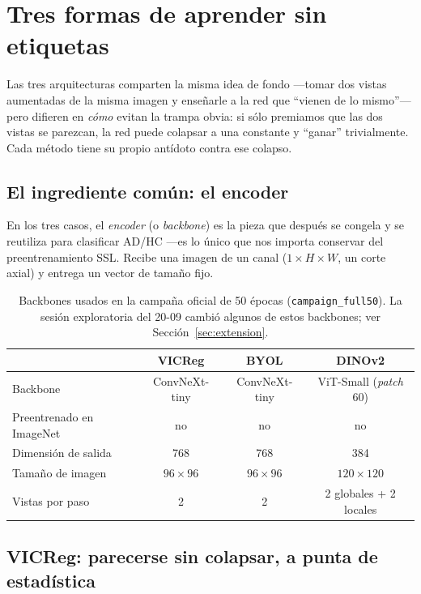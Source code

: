 \documentclass[11pt,a4paper]{article}
\begin{document}
\section{Tres formas de aprender sin etiquetas}
\label{sec:models}

Las tres arquitecturas comparten la misma idea de fondo —tomar dos vistas
aumentadas de la misma imagen y enseñarle a la red que ``vienen de lo
mismo''— pero difieren en \emph{cómo} evitan la trampa obvia: si sólo
premiamos que las dos vistas se parezcan, la red puede colapsar a una
constante y ``ganar'' trivialmente. Cada método tiene su propio antídoto
contra ese colapso.

\subsection{El ingrediente común: el encoder}

En los tres casos, el \emph{encoder} (o \emph{backbone}) es la pieza que
después se congela y se reutiliza para clasificar AD/HC —es lo único que nos
importa conservar del preentrenamiento SSL. Recibe una imagen de un canal
($1\times H\times W$, un corte axial) y entrega un vector de tamaño fijo.

\begin{table}[htbp]
\centering
\small
\begin{tabular}{lccc}
\toprule
 & \textbf{VICReg} & \textbf{BYOL} & \textbf{DINOv2} \\
\midrule
Backbone & ConvNeXt-tiny & ConvNeXt-tiny & ViT-Small (\emph{patch} 60) \\
Preentrenado en ImageNet & no & no & no \\
Dimensión de salida & 768 & 768 & 384 \\
Tamaño de imagen & $96\times96$ & $96\times96$ & $120\times120$ \\
Vistas por paso & 2 & 2 & 2 globales + 2 locales \\
\bottomrule
\end{tabular}
\caption{Backbones usados en la campaña oficial de 50 épocas
(\texttt{campaign\_full50}). La sesión exploratoria del 20-09 cambió algunos
de estos backbones; ver Sección~\ref{sec:extension}.}
\label{tab:backbones}
\end{table}

\subsection{VICReg: parecerse sin colapsar, a punta de estadística}
\end{document}

